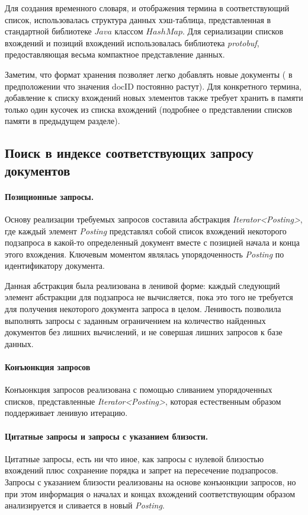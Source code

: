 \documentclass[12pt]{article}
\begin{document}
Для создания временного словаря, и отображения термина в соответствующий список,
использовалась структура данных хэш-таблица, представленная в стандартной библиотеке
$Java$ классом $HashMap$. Для сериализации списков вхождений и позиций вхождений
использовалась библиотека \emph{protobuf}, предоставляющая весьма компактное представление данных.

Заметим, что формат хранения позволяет легко добавлять новые документы (
в предположении что значения $\mathrm{docID}$ постоянно растут).
Для конкретного термина, добавление к списку вхождений новых элементов также требует хранить в памяти
только один кусочек из списка вхождений (подробнее о представлении списков памяти в предыдущем разделе).

\subsection{Поиск в индексе соответствующих запросу документов}

\paragraph{Позиционные запросы.}  Основу реализации требуемых запросов составила
абстракция \emph{Iterator<Posting>}, где каждый элемент \emph{Posting} представлял 
собой список вхождений некоторого подзапроса в какой-то определенный документ
вместе с позицией начала и конца этого вхождения. Ключевым моментом
являлась упорядоченность \emph{Posting} по идентификатору документа.

Данная абстракция была реализована в ленивой форме: каждый следующий элемент 
абстракции для подзапроса не вычисляется, пока это того не требуется для получения
некоторого документа запроса в целом. Ленивость позволила выполнять запросы 
с заданным ограничением на количество найденных документов без лишних вычислений,
и не совершая лишних запросов к базе данных.

\paragraph{Конъюнкция запросов} Конъюнкция запросов реализована с помощью
сливанием упорядоченных списков, представленные \emph{Iterator<Posting>}, которая 
естественным образом поддерживает ленивую итерацию.

\paragraph{Цитатные запросы и запросы с указанием близости.} Цитатные запросы, есть
ни что иное, как запросы с нулевой близостью вхождений плюс сохранение порядка
и запрет на пересечение подзапросов. Запросы с указанием близости реализованы на
основе конъюнкции запросов, но при этом информация о началах и концах вхождений
соответствующим образом анализируется и сливается в новый \emph{Posting}.
\end{document}
